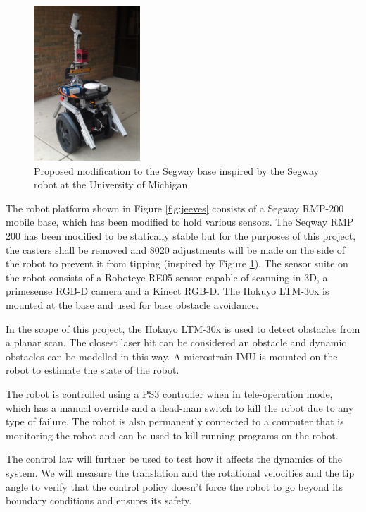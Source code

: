 \documentclass[journal]{IEEEtran}
\begin{document}
\begin{figure}
    \centering
    \includegraphics[width = 4cm, scale=0.2]{segway1.jpg}
    \caption{Proposed modification to the Segway base inspired by the Segway robot at the University of Michigan}
    \label{fig:mod_jeeves}
\end{figure}

The robot platform shown in Figure \ref{fig:jeeves} consists of a Segway RMP-200 mobile base, which has been
modified to hold various sensors. The Seqway RMP 200 has been modified to be statically stable but for the purposes of this project, the casters shall be removed and 8020 adjustments will be made on the side of the robot to prevent it from tipping (inspired by Figure \ref{fig:mod_jeeves}). The sensor suite on the robot consists of a Roboteye RE05 sensor capable of scanning in 3D, a primesense RGB-D camera and a Kinect RGB-D. The Hokuyo LTM-30x is mounted at the base and used for base obstacle avoidance. 

In the scope of this project, the Hokuyo LTM-30x is used to detect obstacles from a planar scan. The closest laser hit can be considered an obstacle and dynamic obstacles can be modelled in this way. A microstrain IMU is mounted on the robot to estimate the state of the robot.

The robot is controlled using a PS3 controller when in tele-operation mode, which has a manual override and a dead-man switch to kill the robot due to any type of failure. The robot is also permanently connected to a computer that is monitoring the robot and can be used to kill running programs on the robot.

The control law will further be used to test how it affects the dynamics of the system. We will measure the translation and the rotational velocities and the tip angle to verify that the control policy doesn't force the robot to go beyond its boundary conditions and ensures its safety.
\end{document}
